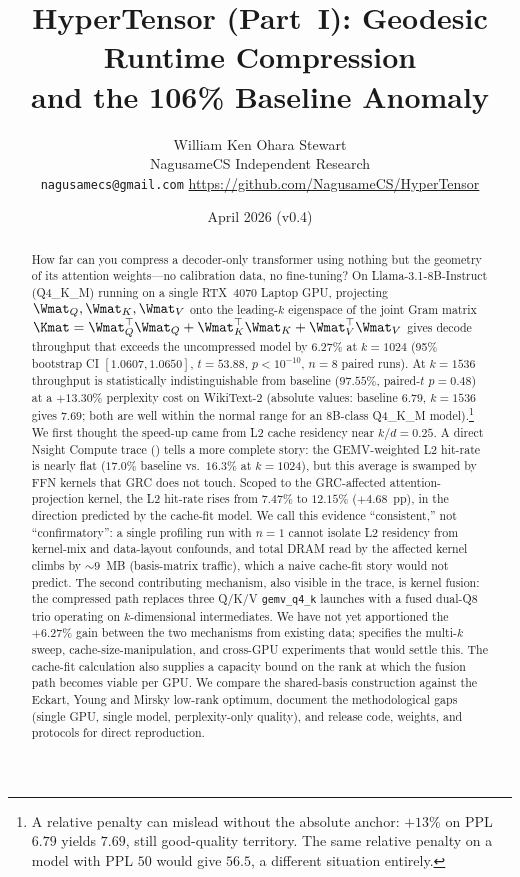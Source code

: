 \documentclass[11pt]{article}
\title{HyperTensor (Part~I): Geodesic Runtime Compression\\and the 106\% Baseline Anomaly}
\author{William Ken Ohara Stewart\\
\small NagusameCS Independent Research\\
\small \texttt{nagusamecs@gmail.com} \quad \url{https://github.com/NagusameCS/HyperTensor}}
\date{April 2026 (v0.4)}
\begin{document}
\maketitle
\hypertensorbanner

\begin{abstract}
\noindent
How far can you compress a decoder-only transformer using nothing but
the geometry of its attention weights---no calibration data, no
fine-tuning?  On Llama-3.1-8B-Instruct (Q4\_K\_M) running on a single
RTX~4070 Laptop GPU, projecting $\Wmat_Q,\Wmat_K,\Wmat_V$ onto the
leading-$k$ eigenspace of the joint Gram matrix
$\Kmat=\Wmat_Q^\top\Wmat_Q+\Wmat_K^\top\Wmat_K+\Wmat_V^\top\Wmat_V$
gives decode throughput that exceeds the uncompressed model
by $6.27\%$ at $k{=}1024$ (95\% bootstrap CI $[1.0607,1.0650]$, $t{=}53.88$,
$p<10^{-10}$, $n{=}8$ paired runs). At $k{=}1536$ throughput is
statistically indistinguishable from baseline ($97.55\%$, paired-$t$ $p{=}0.48$)
at a $+13.30\%$ perplexity cost on WikiText-2 (absolute values: baseline $6.79$, $k{=}1536$ gives $7.69$; both are well within the normal range for an 8B-class Q4\_K\_M model).\footnote{A relative penalty can mislead without the absolute anchor: $+13\%$ on PPL $6.79$ yields $7.69$, still good-quality territory. The same relative penalty on a model with PPL $50$ would give $56.5$, a different situation entirely.}  We first thought the speed-up came from L2 cache residency near $k/d{=}0.25$.
A direct Nsight Compute trace () tells a more
complete story: the GEMV-weighted L2 hit-rate is nearly flat ($17.0\%$ baseline vs.\
$16.3\%$ at $k{=}1024$), but this average is swamped by FFN kernels that GRC
does not touch. Scoped to the GRC-affected attention-projection kernel,
the L2 hit-rate rises from $7.47\%$ to $12.15\%$ ($+4.68$~pp), in the
direction predicted by the cache-fit model. We call this evidence
``consistent,'' not ``confirmatory'': a single profiling
run with $n{=}1$ cannot isolate L2 residency from kernel-mix and
data-layout confounds, and total DRAM read by the affected kernel
climbs by ${\sim}9$~MB (basis-matrix traffic), which a naive cache-fit
story would not predict. The second contributing mechanism, also visible in the trace,
is kernel fusion: the compressed path replaces three Q/K/V \texttt{gemv\_q4\_k}
launches with a fused dual-Q8 trio operating on $k$-dimensional intermediates.
We have not yet apportioned the $+6.27\%$ gain between the
two mechanisms from existing data;  specifies the
multi-$k$ sweep, cache-size-manipulation, and cross-GPU experiments that
would settle this. The cache-fit calculation also supplies a
capacity bound on the rank at which the fusion path becomes
viable per GPU. We compare the shared-basis construction against the
Eckart, Young and Mirsky low-rank optimum, document the methodological
gaps (single GPU, single model, perplexity-only quality), and release code,
weights, and protocols for direct reproduction.
\end{abstract}
\end{document}
